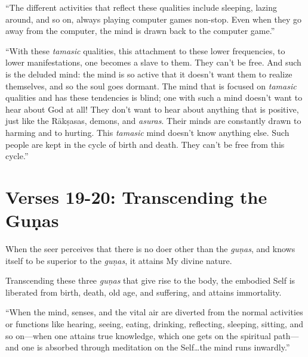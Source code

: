 \enquote{The different activities that reflect these qualities include sleeping, lazing around, and so on, always playing computer games non-stop. Even when they go away from the computer, the mind is drawn back to the computer game.}

\enquote{With these \textit{tamasic} qualities, this attachment to these lower frequencies, to lower manifestations, one becomes a slave to them. They can’t be free. And such is the deluded mind: the mind is so active that it doesn’t want them to realize themselves, and so the soul goes dormant. The mind that is focused on \textit{tamasic} qualities and has these tendencies is blind; one with such a mind doesn’t want to hear about God at all! They don’t want to hear about anything that is positive, just like the Rākṣasas, demons, and \textit{asuras}. Their minds are constantly drawn to harming and to hurting. This \textit{tamasic} mind doesn’t know anything else. Such people are kept in the cycle of birth and death. They can’t be free from this cycle.}

\section{Verses 19-20: Transcending the Guṇas}\label{sec-verses-19-20-transcending-the-gunas}

{When the seer perceives that there is no doer other than the \textit{guṇas}, and knows itself to be superior to the \textit{guṇas}, it attains My divine nature.}

{Transcending these three \textit{guṇas} that give rise to the body, the embodied Self is liberated from birth, death, old age, and suffering, and attains immortality.}

\enquote{When the mind, senses, and the vital air are diverted from the normal activities or functions like hearing, seeing, eating, drinking, reflecting, sleeping, sitting, and so on---when one attains true knowledge, which one gets on the spiritual path---and one is absorbed through meditation on the Self\ldots the mind runs inwardly.}

